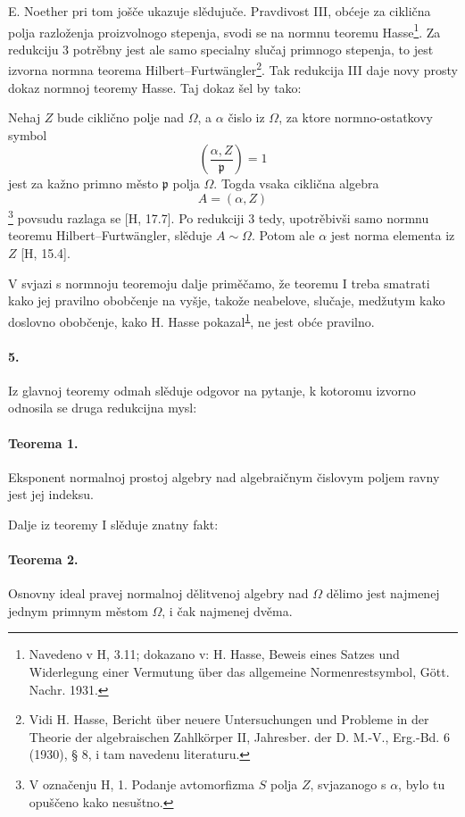 \documentclass[11pt]{article}
\newcommand{\foreign}[1]{#1}
\begin{document}
E. Noether pri tom jošče ukazuje slědujuče.
Pravdivost III, obćeje za ciklična polja razloženja proizvolnogo stepenja, svodi se na normnu teoremu Hasse\footnote{\label{fn:p38-hasse-normensatz}Navedeno v H, 3.11; dokazano v: \foreign{H. Hasse, Beweis eines Satzes und Widerlegung einer Vermutung über das allgemeine Normenrestsymbol, Gött. Nachr. 1931}.}. Za redukciju 3 potrěbny jest ale samo specialny slučaj primnogo stepenja, to jest izvorna normna teorema Hilbert--Furtwängler\footnote{Vidi \foreign{H. Hasse, Bericht über neuere Untersuchungen und Probleme in der Theorie der algebraischen Zahlkörper II, Jahresber. der D. M.-V., Erg.-Bd. 6 (1930), § 8}, i tam navedenu literaturu.}. Tak redukcija III daje novy prosty dokaz normnoj teoremy Hasse. Taj dokaz šel by tako:

Nehaj \(Z\) bude ciklično polje nad \(\Omega\), a \(\alpha\) čislo iz \(\Omega\), za ktore normno-ostatkovy symbol
\[
\left(\frac{\alpha,Z}{\mathfrak p}\right)=1
\]
jest za kažno primno město \(\mathfrak p\) polja \(\Omega\). Togda vsaka ciklična algebra
\[
A=(\alpha,Z)
\]
\footnote{V označenju H, 1. Podanje avtomorfizma \(S\) polja \(Z\), svjazanogo s \(\alpha\), bylo tu opuščeno kako nesuštno.} povsudu razlaga se [H, 17.7]. Po redukciji 3 tedy, upotrěbivši samo normnu teoremu Hilbert--Furtwängler, slěduje \(A\sim\Omega\). Potom ale \(\alpha\) jest norma elementa iz \(Z\) [H, 15.4].

V svjazi s normnoju teoremoju dalje priměčamo, že teoremu I treba smatrati kako jej pravilno obobčenje na vyšje, takože neabelove, slučaje, medžutym kako doslovno obobčenje, kako H. Hasse pokazal\textsuperscript{\ref{fn:p38-hasse-normensatz}}, ne jest obće pravilno.

\paragraph{5.}
Iz glavnoj teoremy odmah slěduje odgovor na pytanje, k kotoromu izvorno odnosila se druga redukcijna mysl:

\paragraph{Teorema 1.}
Eksponent normalnoj prostoj algebry nad algebraičnym čislovym poljem ravny jest jej indeksu.

Dalje iz teoremy I slěduje znatny fakt:

\paragraph{Teorema 2.}
Osnovny ideal pravej normalnoj dělitvenoj algebry nad \(\Omega\) dělimo jest najmenej jednym primnym městom \(\Omega\), i čak najmenej dvěma.
\end{document}
